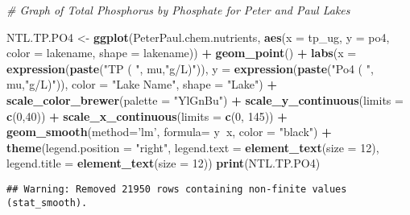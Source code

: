 \documentclass[]{article}
\newenvironment{Shaded}{\begin{snugshade}}{\end{snugshade}}
\newcommand{\KeywordTok}[1]{\textcolor[rgb]{0.13,0.29,0.53}{\textbf{#1}}}
\newcommand{\DataTypeTok}[1]{\textcolor[rgb]{0.13,0.29,0.53}{#1}}
\newcommand{\DecValTok}[1]{\textcolor[rgb]{0.00,0.00,0.81}{#1}}
\newcommand{\StringTok}[1]{\textcolor[rgb]{0.31,0.60,0.02}{#1}}
\newcommand{\CommentTok}[1]{\textcolor[rgb]{0.56,0.35,0.01}{\textit{#1}}}
\newcommand{\OperatorTok}[1]{\textcolor[rgb]{0.81,0.36,0.00}{\textbf{#1}}}
\newcommand{\NormalTok}[1]{#1}
\begin{document}
\begin{Shaded}
\begin{Highlighting}[]
\CommentTok{# Graph of Total Phosphorus by Phosphate for Peter and Paul Lakes}

\NormalTok{NTL.TP.PO4 <-}\StringTok{ }
\StringTok{  }\KeywordTok{ggplot}\NormalTok{(PeterPaul.chem.nutrients, }\KeywordTok{aes}\NormalTok{(}\DataTypeTok{x =}\NormalTok{ tp_ug, }\DataTypeTok{y =}\NormalTok{ po4, }\DataTypeTok{color =}\NormalTok{ lakename, }\DataTypeTok{shape =}\NormalTok{ lakename)) }\OperatorTok{+}
\StringTok{  }\KeywordTok{geom_point}\NormalTok{() }\OperatorTok{+}
\StringTok{   }\KeywordTok{labs}\NormalTok{(}\DataTypeTok{x =} \KeywordTok{expression}\NormalTok{(}\KeywordTok{paste}\NormalTok{(}\StringTok{"TP ( "}\NormalTok{, mu,}\StringTok{"g/L)"}\NormalTok{)),}
       \DataTypeTok{y =} \KeywordTok{expression}\NormalTok{(}\KeywordTok{paste}\NormalTok{(}\StringTok{"Po4 ( "}\NormalTok{, mu,}\StringTok{"g/L)"}\NormalTok{)),}
      \DataTypeTok{color =} \StringTok{"Lake Name"}\NormalTok{, }\DataTypeTok{shape =} \StringTok{"Lake"}\NormalTok{) }\OperatorTok{+}
\StringTok{  }\KeywordTok{scale_color_brewer}\NormalTok{(}\DataTypeTok{palette =} \StringTok{"YlGnBu"}\NormalTok{) }\OperatorTok{+}
\StringTok{  }\KeywordTok{scale_y_continuous}\NormalTok{(}\DataTypeTok{limits =} \KeywordTok{c}\NormalTok{(}\DecValTok{0}\NormalTok{,}\DecValTok{40}\NormalTok{)) }\OperatorTok{+}
\StringTok{  }\KeywordTok{scale_x_continuous}\NormalTok{(}\DataTypeTok{limits =} \KeywordTok{c}\NormalTok{(}\DecValTok{0}\NormalTok{, }\DecValTok{145}\NormalTok{)) }\OperatorTok{+}
\StringTok{  }\KeywordTok{geom_smooth}\NormalTok{(}\DataTypeTok{method=}\StringTok{'lm'}\NormalTok{, }\DataTypeTok{formula=}\NormalTok{ y}\OperatorTok{~}\NormalTok{x, }\DataTypeTok{color =} \StringTok{"black"}\NormalTok{) }\OperatorTok{+}
\StringTok{  }\KeywordTok{theme}\NormalTok{(}\DataTypeTok{legend.position =} \StringTok{"right"}\NormalTok{, }
        \DataTypeTok{legend.text =} \KeywordTok{element_text}\NormalTok{(}\DataTypeTok{size =} \DecValTok{12}\NormalTok{), }\DataTypeTok{legend.title =} \KeywordTok{element_text}\NormalTok{(}\DataTypeTok{size =} \DecValTok{12}\NormalTok{))}
\KeywordTok{print}\NormalTok{(NTL.TP.PO4)  }
\end{Highlighting}
\end{Shaded}

\begin{verbatim}
## Warning: Removed 21950 rows containing non-finite values (stat_smooth).
\end{verbatim}
\end{document}
